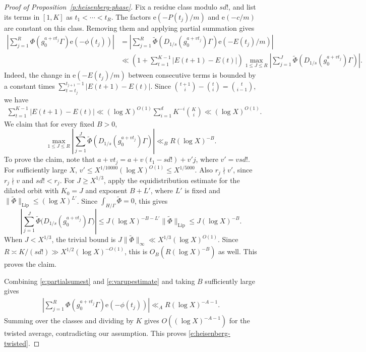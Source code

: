 \documentclass[12pt]{amsart}
\newcommand{\1}{\mathbf 1}
\newcommand{\e}{\mathrm e}
\theoremstyle{definition}
\begin{document}
\begin{proof}[Proof of Proposition~\ref{p:heisenberg-phase}]
Fix a residue class modulo \(sd!\), and list its terms in
\([1,K]\) as \(t_1<\cdots<t_R\). The factors \(\e(-P(t_j)/m)\)
and \(\e(-c/m)\) are constant on this class. Removing them and
applying partial summation gives
\begin{align}\label{e:partialsumest}
 \left|\sum_{j=1}^R
   \Phi(g_0^{a+vt_j}\Gamma)\e(-\phi(t_j))\right|
 &=\left|\sum_{j=1}^R
   \widetilde\Phi(D_{1/s}(g_0^{a+vt_j})\Gamma)
   \e(-E(t_j)/m)\right|\\
 &\ll
 \left(1+\sum_{t=1}^{K-1}|E(t+1)-E(t)|\right)
 \max_{1\leq J\leq R}
 \left|\sum_{j=1}^J
   \widetilde\Phi(D_{1/s}(g_0^{a+vt_j})\Gamma)\right|\nonumber.
\end{align}
Indeed, the change in \(\e(-E(t_j)/m)\) between consecutive terms
is bounded by a constant times
\(\sum_{t=t_j}^{t_{j+1}-1}|E(t+1)-E(t)|\). Since
\(\binom{t+1}{i}-\binom{t}{i}=\binom{t}{i-1}\), we have
\begin{align}\label{e:varupestimate}
    \sum_{t=1}^{K-1}|E(t+1)-E(t)|
 \ll (\log X)^{O(1)}\sum_{i=1}^d K^{-i}\binom{K}{i}
 \ll(\log X)^{O(1)}.
\end{align}
We claim that for every fixed \(B>0\),
\[
 \max_{1\leq J\leq R}
 \left|\sum_{j=1}^J
   \widetilde\Phi(D_{1/s}(g_0^{a+vt_j})\Gamma)\right|
 \ll_B R(\log X)^{-B}.
\]
To prove the claim, note that \(a+vt_j=a+v(t_1-sd!)+v'j\),
where \(v'=vsd!\). For sufficiently large \(X\),
\(v'\leq X^{1/10000}(\log X)^{O(1)}\leq X^{1/5000}\).
Also \(r_j\nmid v'\), since \(r_j\nmid v\) and \(sd!<r_j\).
For \(J\geq X^{1/3}\), apply the equidistribution estimate for
the dilated orbit with \(K_0=J\) and exponent \(B+L'\), where
\(L'\) is fixed and
\(\|\widetilde\Phi\|_{\mathrm{Lip}}\leq(\log X)^{L'}\).
Since \(\int_{H/\Gamma}\widetilde\Phi=0\), this gives
\[
 \left|\sum_{j=1}^J
 \widetilde\Phi\bigl(D_{1/s}(g_0^{a+vt_j})\Gamma\bigr)\right|
 \leq J(\log X)^{-B-L'}\|\widetilde\Phi\|_{\mathrm{Lip}}
 \leq J(\log X)^{-B}.
\]
When \(J<X^{1/3}\), the trivial bound is
\(J\|\widetilde\Phi\|_\infty\ll X^{1/3}(\log X)^{O(1)}\).
Since \(R\asymp K/(sd!)\gg X^{1/2}(\log X)^{-O(1)}\), this is
\(O_B(R(\log X)^{-B})\) as well. This proves the claim.

Combining \eqref{e:partialsumest} and \eqref{e:varupestimate}
and taking $B$ sufficiently large gives
\begin{align*}
    \left|\sum_{j=1}^R
   \Phi(g_0^{a+vt_j}\Gamma)\e(-\phi(t_j))\right| \ll_A R(\log X)^{-A-1}.
\end{align*}
Summing over the classes and dividing
by \(K\) gives \(O((\log X)^{-A-1})\) for the twisted average,
contradicting our assumption. This proves
\eqref{e:heisenberg-twisted}.


\end{proof}
\end{document}
